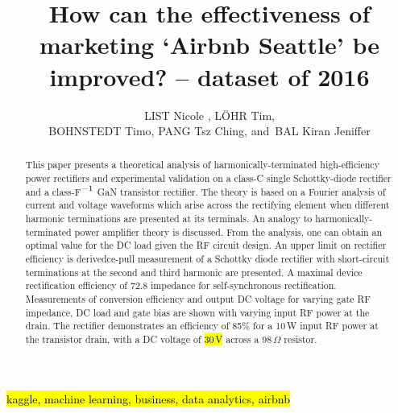 \documentclass[journal]{IEEEtran}
\begin{document}
    \title{How can the effectiveness of marketing ‘Airbnb Seattle’ be improved?
– dataset of 2016 
}
  \author{LIST Nicole ,
      L\"OHR Tim,\\
      BOHNSTEDT Timo,
      PANG Tsz Ching,
      and~BAL Kiran Jeniffer%
}



\maketitle



\begin{abstract}
This paper presents a theoretical analysis of harmonically-terminated high-efficiency power rectifiers and experimental validation on a class-C single Schottky-diode rectifier and a class-F$^{\rm -1}$ GaN transistor rectifier. The theory is based on a Fourier analysis of current and voltage waveforms which arise across the rectifying element when different harmonic terminations are presented at its terminals. An analogy to harmonically-terminated power amplifier theory is discussed. From the analysis, one can obtain an optimal value for the DC load given the RF circuit design. An upper limit on rectifier efficiency is derivedce-pull measurement of a Schottky diode rectifier with short-circuit terminations at the second and third harmonic are presented. A maximal device rectification efficiency of 72.8 impedance for self-synchronous rectification. Measurements of conversion efficiency and output DC voltage for varying gate RF impedance, DC load and gate bias are shown with varying input RF power at the drain. The rectifier demonstrates an efficiency of 85\% for a 10\,W input RF power at the transistor drain, with a DC voltage of \hl{30\,V} across a 98\,$\Omega$ resistor.
\end{abstract}

\begin{IEEEkeywords}
\hl{kaggle, machine learning, business, data analytics, airbnb}
\end{IEEEkeywords}

\IEEEpeerreviewmaketitle

\end{document}
